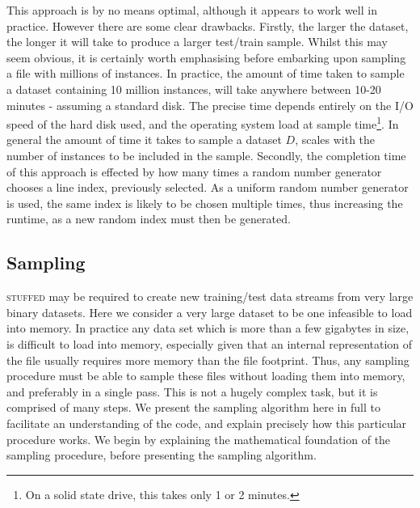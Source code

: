 \documentclass[twoside,a4paper]{refart}
\begin{document}
This approach is by no means optimal, although it appears to work well in practice. However there are some clear drawbacks. Firstly, the larger the dataset, the longer it will take to produce a larger test/train sample. Whilst this may seem obvious, it is certainly worth emphasising before embarking upon sampling a file with millions of instances. In practice, the amount of time taken to sample a dataset containing 10 million instances, will take anywhere between 10-20 minutes - assuming a standard disk. The precise time depends entirely on the I/O speed of the hard disk used, and the operating system load at sample time\footnote{On a solid state drive, this takes only 1 or 2 minutes.}. In general the amount of time it takes to sample a dataset $D$, scales with the number of instances to be included in the sample. Secondly, the completion time of this approach is effected by how many times a random number generator chooses a line index, previously selected. As a uniform random number generator is used, the same index is likely to be chosen multiple times, thus increasing the runtime, as a new random index must then be generated.

\subsection{Sampling}
\label{sec:sampling}
\textsc{stuffed} may be required to create new training/test data streams from very large binary datasets. Here we consider a very large dataset to be one infeasible to load into memory. In practice any data set which is more than a few gigabytes in size, is difficult to load into memory, especially given that an internal representation of the file usually requires more memory than the file footprint. Thus, any sampling procedure must be able to sample these files without loading them into memory, and preferably in a single pass. This is not a hugely complex task, but it is comprised of many steps. We present the sampling algorithm here in full to facilitate an understanding of the code, and explain precisely how this particular procedure works. We begin by explaining the mathematical foundation of the sampling procedure, before presenting the sampling algorithm.\\
\end{document}
